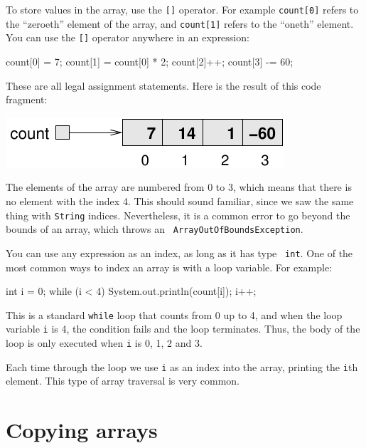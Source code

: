 To store values in the array, use the
{\tt []} operator.  For example {\tt count[0]} refers to the
``zeroeth'' element of the array, and {\tt count[1]} refers to the
``oneth'' element.  You can use the {\tt []} operator anywhere in an
expression:

\begin{code}
    count[0] = 7;
    count[1] = count[0] * 2;
    count[2]++;
    count[3] -= 60;
\end{code}

These are all legal assignment statements.  Here is the
result of this code fragment:


\includegraphics{figs/array2.pdf}


The elements of the array
are numbered from 0 to 3, which means that there is no element with
the index 4.  This should sound familiar, since we saw the same thing
with {\tt String} indices.  Nevertheless, it is a common error to go
beyond the bounds of an array, which throws an {\tt
ArrayOutOfBoundsException}.

You can use any expression as an index, as long as it has type {\tt
int}.  One of the most common ways to index an array is with a loop
variable.  For example:

\begin{code}
    int i = 0;
    while (i < 4) {
        System.out.println(count[i]);
        i++;
    }
\end{code}

This is a standard {\tt while} loop that counts from 0
up to 4, and when the loop variable {\tt i} is 4, the
condition fails and the loop terminates.  Thus, the body
of the loop is only executed when {\tt i} is 0, 1, 2 and 3.


Each time through the loop we use {\tt i} as an index into
the array, printing the {\tt i}th element.  This type of
array traversal is very common.


\section{Copying arrays}

